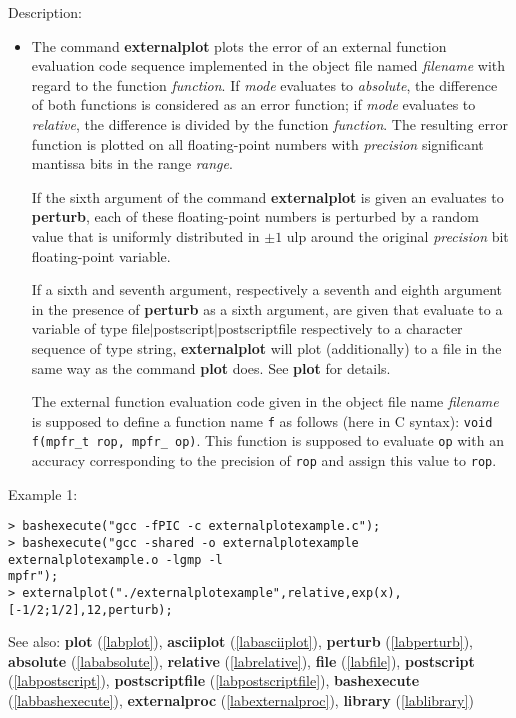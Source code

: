 \noindent Description: \begin{itemize}

\item The command \textbf{externalplot} plots the error of an external function
   evaluation code sequence implemented in the object file named
   \emph{filename} with regard to the function \emph{function}.  If \emph{mode}
   evaluates to \emph{absolute}, the difference of both functions is
   considered as an error function; if \emph{mode} evaluates to \emph{relative},
   the difference is divided by the function \emph{function}. The resulting
   error function is plotted on all floating-point numbers with
   \emph{precision} significant mantissa bits in the range \emph{range}. 
    
   If the sixth argument of the command \textbf{externalplot} is given an evaluates to
   \textbf{perturb}, each of these floating-point numbers is perturbed by a
   random value that is uniformly distributed in $\pm1$ ulp
   around the original \emph{precision} bit floating-point variable.
    
   If a sixth and seventh argument, respectively a seventh and eighth
   argument in the presence of \textbf{perturb} as a sixth argument, are given
   that evaluate to a variable of type \textsf{file$|$postscript$|$postscriptfile} respectively to a
   character sequence of type \textsf{string}, \textbf{externalplot} will plot
   (additionally) to a file in the same way as the command \textbf{plot}
   does. See \textbf{plot} for details.
    
   The external function evaluation code given in the object file name
   \emph{filename} is supposed to define a function name \texttt{f} as
   follows (here in C syntax): \texttt{void f(mpfr\_t rop, mpfr\_ op)}. 
   This function is supposed to evaluate \texttt{op} with an accuracy corresponding
   to the precision of \texttt{rop} and assign this value to
   \texttt{rop}.
\end{itemize}
\noindent Example 1: 
\begin{center}\begin{minipage}{15cm}\begin{Verbatim}[frame=single]
> bashexecute("gcc -fPIC -c externalplotexample.c");
> bashexecute("gcc -shared -o externalplotexample externalplotexample.o -lgmp -l
mpfr");
> externalplot("./externalplotexample",relative,exp(x),[-1/2;1/2],12,perturb);
\end{Verbatim}
\end{minipage}\end{center}
See also: \textbf{plot} (\ref{labplot}), \textbf{asciiplot} (\ref{labasciiplot}), \textbf{perturb} (\ref{labperturb}), \textbf{absolute} (\ref{lababsolute}), \textbf{relative} (\ref{labrelative}), \textbf{file} (\ref{labfile}), \textbf{postscript} (\ref{labpostscript}), \textbf{postscriptfile} (\ref{labpostscriptfile}), \textbf{bashexecute} (\ref{labbashexecute}), \textbf{externalproc} (\ref{labexternalproc}), \textbf{library} (\ref{lablibrary})
